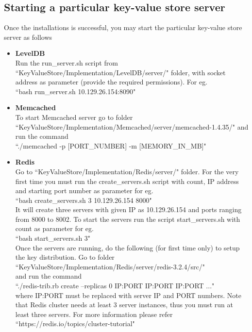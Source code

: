 \documentclass[11pt]{article}
\begin{document}
\subsection{Starting a particular key-value store server}
Once the installations is successful, you may start the particular key-value store server as follows
\begin{itemize}
\item \textbf{LevelDB}\\
Run the run\_server.sh script from  ``KeyValueStore/Implementation/LevelDB/server/" folder, with socket address as parameter (provide the required permissions). For eg.\\
``bash run\_server.sh 10.129.26.154:8090"

\item \textbf{Memcached}\\
To start Memcached server go to folder\\
``KeyValueStore/Implementation/Memcached/server/memcached-1.4.35/" and run the command \\
``./memcached -p [PORT\_NUMBER] -m [MEMORY\_IN\_MB]"

\item \textbf{Redis}\\
Go to ``KeyValueStore/Implementation/Redis/server/" folder.
For the very first time you must run the create\_servers.sh script with count, IP address and starting port number as parameter for eg.\\
``bash create\_servers.sh 3 10.129.26.154 8000"\\
It will create three servers with given IP as 10.129.26.154 and ports ranging from 8000 to 8002. To start the servers run the script start\_servers.sh with count as parameter for eg.\\
``bash start\_servers.sh 3"\\
Once the servers are running, do the following (for first time only) to setup the key distribution. Go to folder\\
``KeyValueStore/Implementation/Redis/server/redis-3.2.4/src/"\\
and run the command\\
``./redis-trib.rb create --replicas 0 IP:PORT IP:PORT IP:PORT ..."\\
where IP:PORT must be replaced with server IP and PORT numbers.
Note that Redis cluster needs at least 3 server instances, thus you must run at least three servers.
For more information please refer \\
``https://redis.io/topics/cluster-tutorial"
\end{itemize}
\end{document}
